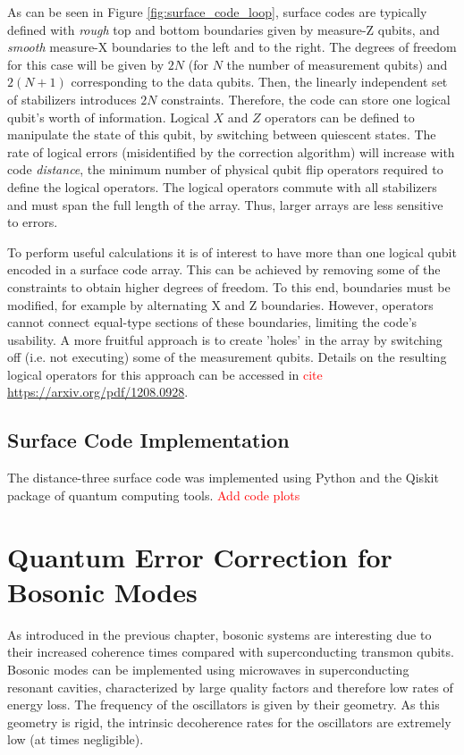 As can be seen in Figure \ref{fig:surface_code_loop}, surface codes are typically defined with \textit{rough} top and bottom boundaries given by measure-Z qubits, and \textit{smooth} measure-X boundaries to the left and to the right. The degrees of freedom for this case will be given by $2N$ (for $N$ the number of measurement qubits) and $2(N+1)$ corresponding to the data qubits. Then, the linearly independent set of stabilizers introduces $2N$ constraints. Therefore, the code can store one logical qubit's worth of information. Logical $X$ and $Z$ operators can be defined to manipulate the state of this qubit, by switching between quiescent states. The rate of logical errors (misidentified by the correction algorithm) will increase with code \textit{distance}, the minimum number of physical qubit flip operators required to define the logical operators. The logical operators commute with all stabilizers and must span the full length of the array. Thus, larger arrays are less sensitive to errors. 

To perform useful calculations it is of interest to have more than one logical qubit encoded in a surface code array. This can be achieved by removing some of the constraints to obtain higher degrees of freedom. To this end, boundaries must be modified, for example by alternating X and Z boundaries. However, operators cannot connect equal-type sections of these boundaries, limiting the code's usability. A more fruitful approach is to create 'holes' in the array by switching off (i.e. not executing) some of the measurement qubits. Details on the resulting logical operators for this approach can be accessed in \textcolor{red}{cite \url{https://arxiv.org/pdf/1208.0928}}.

\subsection{Surface Code Implementation}

The distance-three surface code was implemented using Python and the Qiskit package of quantum computing tools. \textcolor{red}{Add code plots}

\section{Quantum Error Correction for Bosonic Modes}

As introduced in the previous chapter, bosonic systems are interesting due to their increased coherence times compared with superconducting transmon qubits. Bosonic modes can be implemented using microwaves in superconducting resonant cavities, characterized by large quality factors and therefore low rates of energy loss. The frequency of the oscillators is given by their geometry. As this geometry is rigid, the intrinsic decoherence rates for the oscillators are extremely low (at times negligible). 

